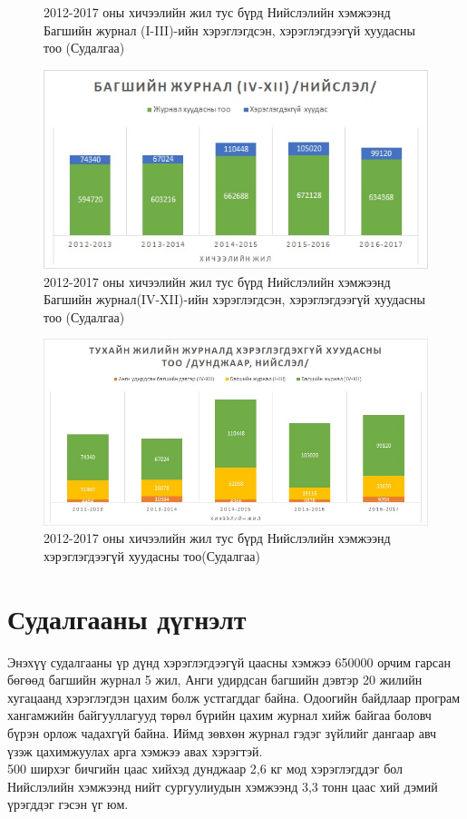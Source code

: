 \begin{figure}[htbp]
\caption[Хэрэглэгчийн судалгаа]{2012-2017 оны хичээлийн жил тус бүрд Нийслэлийн хэмжээнд Багшийн журнал (I-III)-ийн хэрэглэгдсэн, хэрэглэгдээгүй хуудасны тоо (Судалгаа)}
\label{fig:Chart2}
\end{figure}\begin{figure}[htbp]
\centering
\includegraphics[scale=0.9]{Chart/Chart9}
\caption[Хэрэглэгчийн судалгаа]{2012-2017 оны хичээлийн жил тус бүрд Нийслэлийн хэмжээнд Багшийн журнал(IV-XII)-ийн хэрэглэгдсэн, хэрэглэгдээгүй хуудасны тоо (Судалгаа)}
\label{fig:Chart2}
\end{figure}\begin{figure}[htbp]
\centering
\includegraphics[scale=0.7]{Chart/Chart10}
\caption[Хэрэглэгчийн судалгаа]{2012-2017 оны хичээлийн жил тус бүрд Нийслэлийн хэмжээнд хэрэглэгдээгүй хуудасны тоо(Судалгаа)}
\label{fig:Chart2}
\end{figure}
\section{Судалгааны дүгнэлт}
Энэхүү судалгааны үр дүнд хэрэглэгдээгүй цаасны хэмжээ 650000 орчим гарсан бөгөөд багшийн журнал 5 жил, Анги удирдсан багшийн дэвтэр 20 жилийн хугацаанд хэрэглэгдэн цахим болж устгагддаг байна. Одоогийн байдлаар програм хангамжийн байгууллагууд төрөл бүрийн цахим журнал хийж байгаа боловч бүрэн орлож чадахгүй байна. Иймд зөвхөн журнал гэдэг зүйлийг дангаар авч үзэж цахимжуулах арга хэмжээ авах хэрэгтэй.\\
500 ширхэг бичгийн цаас хийхэд дунджаар 2,6 кг мод хэрэглэгддэг бол Нийслэлийн хэмжээнд нийт сургуулиудын хэмжээнд 3,3 тонн цаас хий дэмий үрэгддэг гэсэн үг юм. 

